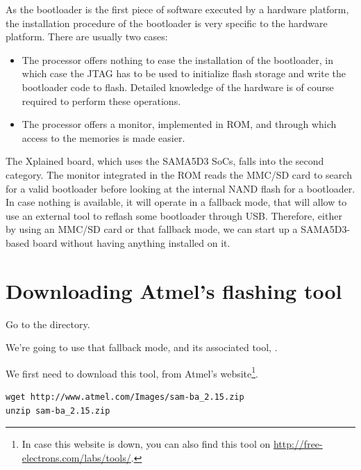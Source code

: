 
As the bootloader is the first piece of software executed by a
hardware platform, the installation procedure of the bootloader is
very specific to the hardware platform. There are usually two cases:

\begin{itemize}

\item The processor offers nothing to ease the installation of the
  bootloader, in which case the JTAG has to be used to initialize
  flash storage and write the bootloader code to flash. Detailed
  knowledge of the hardware is of course required to perform these
  operations.

\item The processor offers a monitor, implemented in ROM, and through
  which access to the memories is made easier.

\end{itemize}

The Xplained board, which uses the SAMA5D3 SoCs, falls into the second
category. The monitor integrated in the ROM reads the MMC/SD card to
search for a valid bootloader before looking at the internal NAND
flash for a bootloader. In case nothing is available, it will operate
in a fallback mode, that will allow to use an external tool
to reflash some bootloader through USB. Therefore, either by using an MMC/SD
card or that fallback mode, we can start up a SAMA5D3-based board
without having anything installed on it.

\section{Downloading Atmel's flashing tool}

Go to the  directory.

We're going to use that fallback mode, and its associated tool,
.

We first need to download this tool, from Atmel's website\footnote{
In case this website is down, you can also find this
tool on \url{http://free-electrons.com/labs/tools/}.}.

\begin{verbatim}
wget http://www.atmel.com/Images/sam-ba_2.15.zip
unzip sam-ba_2.15.zip
\end{verbatim}

